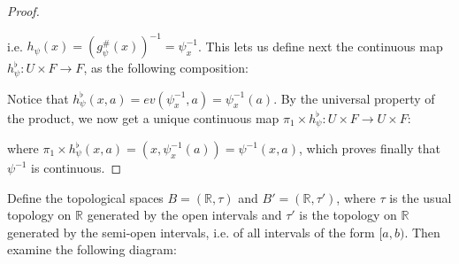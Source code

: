 \begin{proof}
\vspace*{-1em}
\begin{center}
\end{center}
i.e. $h_{\psi}(x)=(g_{\psi}^{\#}(x))^{-1}=\psi^{-1}_x$. This lets us define next the continuous map $h_{\psi}^{\flat}:U\times F\to F$, as the following composition:
\begin{center}
\end{center}
Notice that $h_{\psi}^{\flat}(x,a)=ev(\psi^{-1}_x,a)=\psi^{-1}_x(a)$. By the universal property of the product, we now get a unique continuous map $\pi_1\times h_{\psi}^{\flat}:U\times F\to U\times F$:
\begin{center}
\end{center}
where $\pi_1\times h_{\psi}^{\flat}(x,a)=(x,\psi_x^{-1}(a))=\psi^{-1}(x,a)$, which proves finally that $\psi^{-1}$ is continuous.
\end{proof}





\begin{example} Define the topological spaces $B=(\mathbb{R}, \tau)$ and $B'=(\mathbb{R}, \tau')$, where $\tau$ is the usual topology on $\mathbb{R}$ generated by the open intervals and $\tau'$ is the topology on $\mathbb{R}$ generated by the semi-open intervals, i.e. of all intervals of the form $[a,b)$. Then examine the following diagram:
\begin{center}
\end{center}
\end{example}

